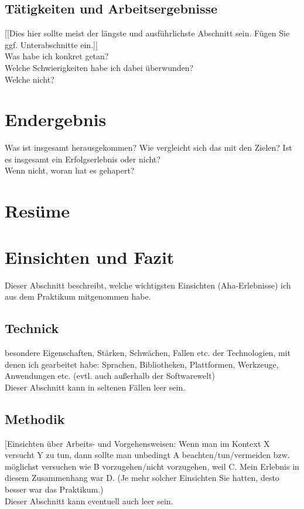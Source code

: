\documentclass[pdftex,12pt,a4paper]{scrreprt}
\begin{document}
\subsection{Tätigkeiten und Arbeitsergebnisse}
[[Dies hier sollte meist der längste und ausführlichste Abschnitt sein. Fügen Sie ggf.
Unterabschnitte ein.]]\\
Was habe ich konkret getan?\\
Welche Schwierigkeiten habe ich dabei überwunden?\\
Welche nicht?\\

\section{Endergebnis}
Was ist insgesamt herausgekommen?
Wie vergleicht sich das mit den Zielen? Ist es insgesamt ein Erfolgserlebnis oder nicht?\\
Wenn nicht, woran hat es gehapert?\\
\section{Resüme}
\section{Einsichten und Fazit}
Dieser Abschnitt beschreibt, welche wichtigsten Einsichten (Aha-Erlebnisse) ich aus dem
Praktikum mitgenommen habe.

\subsection{Technick}
besondere Eigenschaften, Stärken, Schwächen, Fallen etc. der Technologien, mit denen
ich gearbeitet habe: Sprachen, Bibliotheken, Plattformen, Werkzeuge, Anwendungen etc.
(evtl. auch außerhalb der Softwarewelt)\\
Dieser Abschnitt kann in seltenen Fällen leer sein.

\subsection{Methodik}
[Einsichten über Arbeits- und Vorgehensweisen: Wenn man im Kontext X versucht Y zu
tun, dann sollte man unbedingt A beachten/tun/vermeiden bzw. möglichst versuchen wie
B vorzugehen/nicht vorzugehen, weil C. Mein Erlebnis in diesem Zusammenhang war D.
(Je mehr solcher Einsichten Sie hatten, desto besser war das Praktikum.)\\
Dieser Abschnitt kann eventuell auch leer sein.
\end{document}
